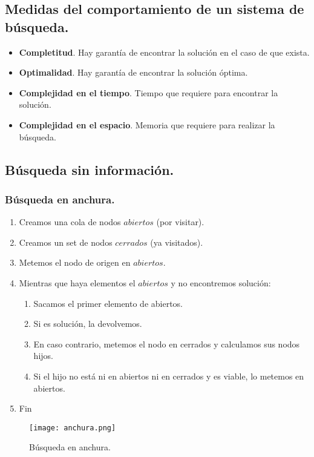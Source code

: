 \documentclass[12pt,spanish]{article}
\numberwithin{definition}{subsection}
\begin{document}
\subsection{Medidas del comportamiento de un sistema de búsqueda.}

\begin{itemize}
	\item \textbf{Completitud}. Hay garantía de encontrar la solución en el caso de que exista.
	\item \textbf{Optimalidad}. Hay garantía de encontrar la solución óptima.
	\item \textbf{Complejidad en el tiempo}. Tiempo que requiere para encontrar la solución.
	\item \textbf{Complejidad en el espacio}. Memoria que requiere para realizar la búsqueda.
\end{itemize}

\subsection{Búsqueda sin información.}


\subsubsection{Búsqueda en anchura.}

\begin{enumerate}
	\item Creamos una cola de nodos $abiertos$ (por visitar).
	\item Creamos un set de nodos $cerrados$ (ya visitados).
	\item Metemos el nodo de origen en $abiertos$.
	\item Mientras que haya elementos el $abiertos$ y no encontremos solución:
		\begin{enumerate}
			\item Sacamos el primer elemento de abiertos.
			\item Si es solución, la devolvemos.
			\item En caso contrario, metemos el nodo en cerrados y calculamos sus nodos hijos.
			\item Si el hijo no está ni en abiertos ni en cerrados y es viable, lo metemos en abiertos.
		\end{enumerate}		
	\item Fin	
\end{enumerate}

\begin{figure}[H]
\centering
\texttt{[image: anchura.png]}
\caption{Búsqueda en anchura.}
\end{figure}
\end{document}

